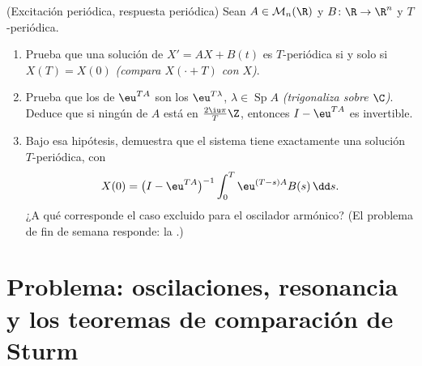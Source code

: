 \begin{exercise}[$\star\star\star$]\label{exo:b2:diffeq:12}
(Excitación periódica, respuesta periódica) Sean $A \in
\mathcal{M}_n(\R)$ y $B \colon \R \to \R^n$  y
$T$-periódica.
\begin{enumerate}
  \item Prueba que una solución de $X' = AX + B(t)$ es $T$-periódica
        si y solo si $X(T) = X(0)$ \emph{(compara $X(\cdot + T)$ con
        $X$)}.
  \item Prueba que los  de $\eu^{TA}$ son los
        $\eu^{T\lambda}$, $\lambda \in \operatorname{Sp}A$
        \emph{(trigonaliza sobre $\C$)}. Deduce que si ningún
         de $A$ está en $\frac{2\iu\pi}{T}\Z$, entonces
        $I - \eu^{TA}$ es invertible.
  \item Bajo esa hipótesis, demuestra que el sistema tiene
        exactamente una solución $T$-periódica, con
        \[
        X(0) = \bigl(I - \eu^{TA}\bigr)^{-1}
        \int_0^{T}\eu^{(T-s)A}B(s)\,\dd s .
        \]
        ¿A qué corresponde el caso excluido para el oscilador
        armónico? (El problema de fin de semana responde: la
        .)
\end{enumerate}
\end{exercise}

\section{Problema: oscilaciones, resonancia y los teoremas de
comparación de Sturm}

